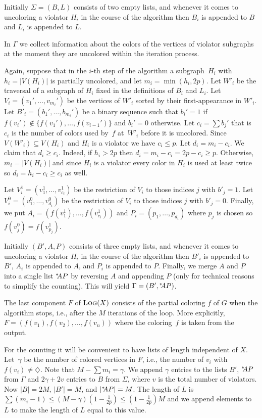 Initially $\Sigma=(B,L)$ consists of two empty lists, and whenever
it comes to uncoloring a violator $H_i$ in the course of the algorithm
then $B_i$ is appended to $B$ and $L_i$ is appended to $L$.

In $\Gamma$ we collect information about the colors of the vertices
of violator subgraphs at the moment they are uncolored within the iteration process.


Again, suppose that in the $i$-th step of the algorithm a
subgraph~$H_i$ with $h_i=|V(H_i)|$ is partially uncolored, and let
$m_i=\min(h_i,2p)$.  Let $W'_i$ be the traversal of a subgraph of
$H_i$ fixed in the definitions of $B_i$ and $L_i$.  Let
$V_i=(v_1',\ldots,v_{m_i}')$ be the vertices of $W'_i$ sorted by their
first-appearance in $W'_i$.  Let $B'_i=(b_1',\ldots,b_{m_i}')$ be a
binary sequence such that $b_i'=1$ if
$f(v_i')\not\in\{f(v_1'),\ldots,f(v_{i-1}')\}$ and $b_i'=0$
otherwise.  Let $c_i=\sum b_j'$ that is $c_i$ is the number of colors
used by~$f$ at~$W'_i$ before it is uncolored.  Since
$V(W'_i)\subseteq V(H_i)$ and $H_i$ is a violator we have
$c_i \leq p$.  Let $d_i = m_i - c_i$.  We claim that $d_i\geq c_i$.
Indeed, if $h_i > 2p$ then $d_i=m_i-c_i = 2p-c_i \geq p$.  Otherwise,
$m_i=|V(H_i)|$ and since $H_i$ is a violator every color in $H_i$ is
used at least twice so $d_i =h_i - c_i\geq c_i$ as well.

Let
$V_i^{1} = (v^1_1,\ldots,v^1_{c_i})$ be the restriction of $V_i$ to
those indices $j$ with $b'_j=1$.  Let
$V_i^{0} = (v^0_1,\ldots,v^0_{d_i})$ be the restriction of $V_i$ to
those indices $j$ with $b'_j=0$.  Finally, we put
$A_i=(f(v^1_1),\ldots,f(v^1_{c_i}))$ and $P_i=(p_1,\ldots,p_{d_i})$
where $p_j$ is chosen so $f(v^0_j) = f(v^1_{p_j})$.

Initially $(B',A,P)$ consists of three empty lists, and whenever
it comes to uncoloring a violator $H_i$ in the course of the algorithm
then $B'_i$ is appended to $B'$, $A_i$ is appended to $A$, and
$P_i$ is appended to $P$. Finally, we  merge $A$ and $P$ into 
a single list ${}^{*}\kern-3pt AP$ by reversing $A$ and appending $P$ 
(only for technical reasons to simplify the counting). 
This will yield $\Gamma=(B',{}^{*}\kern-3pt AP)$.
\medskip

The last component $F$ of $\text{\scshape Log}(X)$ consists of the partial coloring
$f$ of $G$ when the algorithm stops, i.e., after the $M$ iterations of
the loop. More explicitly, $F = (f(v_1),f(v_2),\ldots,f(v_n))$ where 
the coloring~$f$ is taken from the output.

For the counting it will be convenient to have lists of length independent 
of $X$. Let~$\gamma$ be the number of colored vertices in $F$, 
i.e., the number of $v_i$ with $f(v_i)\neq\diamondsuit$.
Note that $M-\sum m_i = \gamma$. 
We append $\gamma$ entries to the lists $B'$, ${}^{*}\kern-3pt AP$ from $\Gamma$
and $2\gamma+2v$ entries to $B$ from $\Sigma$, 
where $v$ is the total number of violators.
Now $|B| = 2M$, $|B'|=M$, and $|{}^{*}\kern-3pt AP|=M$.
The length of $L$ is $\sum (m_i-1) \leq (M - \gamma)\left(1-\frac{1}{2p}\right) \leq \left(1-\frac{1}{2p}\right)M$ and
we append elements to $L$ to make the length of
$L$ equal to this value.


